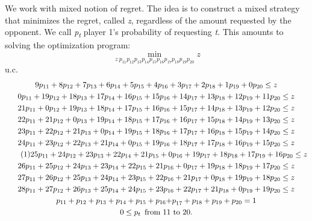 \begin{Article}
\begin{refsection}[Umbhauer]
We work with \textcite{renou2010} mixed notion of regret. The
idea is to construct a mixed strategy that minimizes the regret, called
\emph{z}, regardless of the amount requested by the opponent. We call
\emph{p\textsubscript{t}} player 1's probability of requesting \emph{t}.
This amounts to solving the optimization program:
%
\[
\min_{z\ p_{11}p_{12}p_{13}p_{14}p_{15}p_{16}p_{17}p_{18}p_{19}p_{20}}z
\]
u.c.
\begin{multline}
9p_{11} + 8p_{12} + 7p_{13} + 6p_{14} + 5p_{15} + 4p_{16} + 3p_{17} + 2p_{18} + 1p_{19} + 0p_{20} \leq z \\
0p_{11} + 19p_{12} + 18p_{13} + 17p_{14} + 16p_{15} + 15p_{16} + 14p_{17} + 13p_{18}
+ 12p_{19} + 11p_{20} \leq z \\
21p_{11} + 0p_{12} + 19p_{13} + 18p_{14} + 17p_{15} + 16p_{16} + 15p_{17} + 14p_{18}
+ 13p_{19} + 12p_{20} \leq z \\
22p_{11} + 21p_{12} + 0p_{13} + 19p_{14} + 18p_{15} + 17p_{16} + 16p_{17} + 15p_{18}
+ 14p_{19} + 13p_{20} \leq z \\
23p_{11} + 22p_{12} + 21p_{13} + 0p_{14} + 19p_{15} + 18p_{16} + 17p_{17} + 16p_{18}
+ 15p_{19} + 14p_{20} \leq z \\
24p_{11} + 23p_{12} + 22p_{13} + 21p_{14} + 0p_{15} + 19p_{16} + 18p_{17} + 17p_{18}
+ 16p_{19} + 15p_{20} \leq z \\ \tag{1}
25p_{11} + 24p_{12} + 23p_{13} + 22p_{14} + 21p_{15} + 0p_{16} + 19p_{17} + 18p_{18}
+ 17p_{19} + 16p_{20} \leq z \\
26p_{11} + 25p_{12} + 24p_{13} + 23p_{14} + 22p_{15} + 21p_{16} + 0p_{17} + 19p_{18}
+ 18p_{19} + 17p_{20} \leq z \\
27p_{11} + 26p_{12} + 25p_{13} + 24p_{14} + 23p_{15} + 22p_{16} + 21p_{17} + 0p_{18}
+ 19p_{19} + 18p_{20} \leq z \\
28p_{11} + 27p_{12} + 26p_{13} + 25p_{14} + 24p_{15} + 23p_{16} + 22p_{17} + 21p_{18}
+ 0p_{19} + 19p_{20} \leq z \\
p_{11} + p_{12} + p_{13} + p_{14} + p_{15} + p_{16}{+ p}_{17} + p_{18} + p_{19} + p_{20} = 1 \\
0 \leq p_{t}\enskip \text{from 11 to 20.}
\end{multline}


\end{refsection}
\end{Article}
